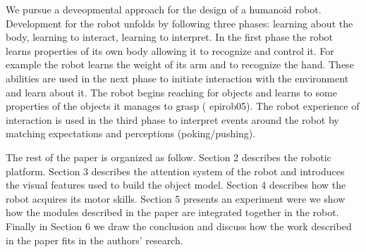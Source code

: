 We pursue a deveopmental approach for the design of a humanoid robot. Development for the robot unfolds by following three phases: learning about the body, learning to interact, learning to interpret. In the first phase the robot learns properties of its own body allowing it to recognize and control it. For example the robot learns the weight of its arm and to recognize the hand. These abilities are used in the next phase to initiate interaction with the environment and learn about it. The robot begins reaching for objects and learns to some properties of the objects it manages to grasp (\cite{natale04learning,natale05exploring} epirob05). The robot experience of interaction is used in the third phase to interpret events around the robot by matching expectations and perceptions (poking/pushing).

The rest of the paper is organized as follow. Section 2 describes the robotic platform. Section 3 describes the attention system of the robot and introduces the visual features used to build the object model. Section 4 describes how the robot acquires its motor skills. Section 5 presents an experiment were we show how the modules described in the paper are integrated together in the robot. Finally in Section 6 we draw the conclusion and discuss how the work described in the paper fits in the authors' research.

